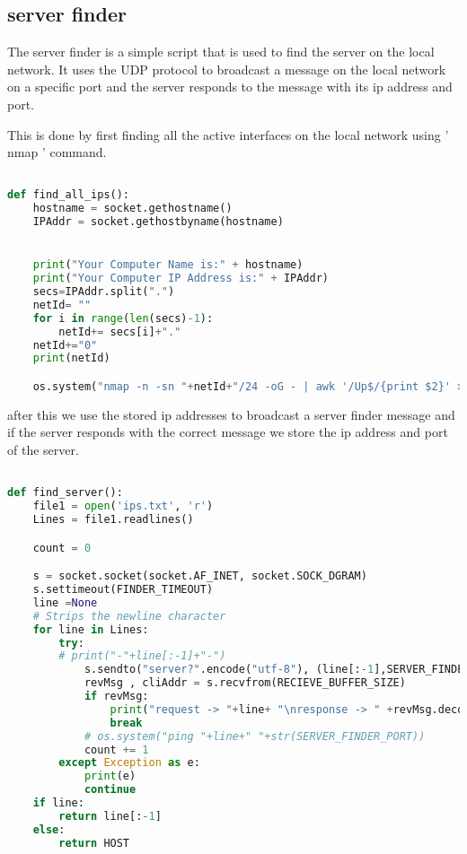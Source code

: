 \subsection{server finder}
The server finder is a simple script that is used to find the server on the local network. It uses the UDP protocol to broadcast a message on the local network on a specific port and the server responds to the message with its ip address and port. 

This is done by first finding all the active interfaces on the local network using ' nmap ' command.

\begin{lstlisting}[language=Python]

def find_all_ips():
    hostname = socket.gethostname()
    IPAddr = socket.gethostbyname(hostname)


    print("Your Computer Name is:" + hostname)
    print("Your Computer IP Address is:" + IPAddr)
    secs=IPAddr.split(".")
    netId= ""
    for i in range(len(secs)-1):
        netId+= secs[i]+"."
    netId+="0"
    print(netId)

    os.system("nmap -n -sn "+netId+"/24 -oG - | awk '/Up$/{print $2}' > ips.txt")
\end{lstlisting}

after this we use the stored ip addresses to broadcast a server finder message and if the server responds with the correct message we store the ip address and port of the server.

\begin{lstlisting}[language=Python] 

def find_server():
    file1 = open('ips.txt', 'r')
    Lines = file1.readlines()

    count = 0

    s = socket.socket(socket.AF_INET, socket.SOCK_DGRAM)
    s.settimeout(FINDER_TIMEOUT)
    line =None
    # Strips the newline character
    for line in Lines:
        try:
        # print("-"+line[:-1]+"-")
            s.sendto("server?".encode("utf-8"), (line[:-1],SERVER_FINDER_PORT))
            revMsg , cliAddr = s.recvfrom(RECIEVE_BUFFER_SIZE)
            if revMsg:
                print("request -> "+line+ "\nresponse -> " +revMsg.decode())
                break
            # os.system("ping "+line+" "+str(SERVER_FINDER_PORT))
            count += 1
        except Exception as e:
            print(e)
            continue
    if line:
        return line[:-1]
    else:
        return HOST
\end{lstlisting}


